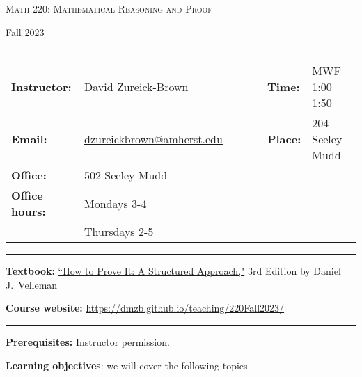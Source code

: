 \documentclass[12pt]{article}
\begin{document}
\begin{center}
{\Large \textsc{Math 220: Mathematical Reasoning and Proof}}
\end{center}
\begin{center}
Fall 2023
\end{center}

\begin{center}
\hrule
\begin{minipage}[t]{.75\textwidth}
\begin{tabular}{llcccll}
\textbf{Instructor:} & David Zureick-Brown & & &  & \textbf{Time:} & MWF 1:00 -- 1:50 \\
  \textbf{Email:} &  \href{mailto: dzureickbrown@amherst.edu}{dzureickbrown@amherst.edu} & & & & \textbf{Place:} & 204 Seeley Mudd \\
  \textbf{Office:} &  502 Seeley Mudd & & & &  & \\
  \textbf{Office hours:} &  Mondays 3-4 & & & &  &\\
  \textbf{}              &  Thursdays 2-5 & & & &  &                                                   
\end{tabular}
\end{minipage}
\hrule
\end{center}


\noindent\textbf{Textbook:}
\href{https://www.amazon.com/How-Prove-Structured-Daniel-Velleman/dp/1108439535/}
{``How to Prove It: A Structured Approach,"} 3rd Edition by Daniel J.~Velleman
\medskip

\noindent\textbf{Course website:} \url{https://dmzb.github.io/teaching/220Fall2023/}
\medskip

\hrule
\medskip

\noindent\textbf{Prerequisites:} Instructor permission.
\smallskip


\noindent \textbf{Learning objectives}: we will cover the following topics.
\end{document}
